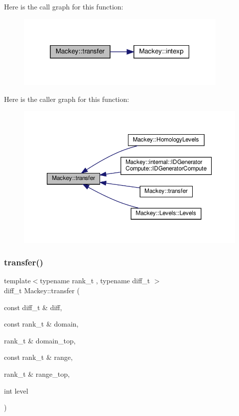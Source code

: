 Here is the call graph for this function\+:\nopagebreak
\begin{figure}[H]
\begin{center}
\leavevmode
\includegraphics[width=289pt]{namespaceMackey_a671613d53fc3b0c9c4b115bc8b2797e6_cgraph}
\end{center}
\end{figure}
Here is the caller graph for this function\+:\nopagebreak
\begin{figure}[H]
\begin{center}
\leavevmode
\includegraphics[width=350pt]{namespaceMackey_a671613d53fc3b0c9c4b115bc8b2797e6_icgraph}
\end{center}
\end{figure}
\mbox{\label{namespaceMackey_ad7524839b58c80d4b2c54827e4833b12}} 
\subsubsection{\texorpdfstring{transfer()}{transfer()}\hspace{0.1cm}{\footnotesize\ttfamily [2/6]}}
{\footnotesize\ttfamily template$<$typename rank\+\_\+t , typename diff\+\_\+t $>$ \\
diff\+\_\+t Mackey\+::transfer (\begin{DoxyParamCaption}\item[{const diff\+\_\+t \&}]{diff,  }\item[{const rank\+\_\+t \&}]{domain,  }\item[{rank\+\_\+t \&}]{domain\+\_\+top,  }\item[{const rank\+\_\+t \&}]{range,  }\item[{rank\+\_\+t \&}]{range\+\_\+top,  }\item[{int}]{level }\end{DoxyParamCaption})}



